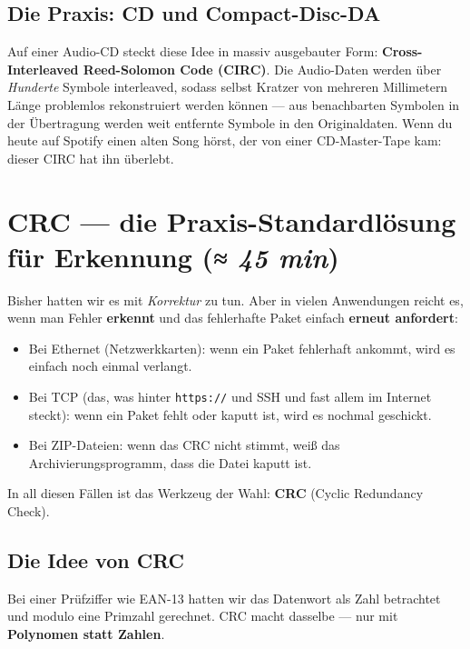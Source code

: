 \subsection*{Die Praxis: CD und Compact-Disc-DA}

Auf einer Audio-CD steckt diese Idee in massiv ausgebauter Form:
\textbf{Cross-Interleaved Reed-Solomon Code (CIRC)}. Die Audio-Daten
werden über \emph{Hunderte} Symbole interleaved, sodass selbst Kratzer
von mehreren Millimetern Länge problemlos rekonstruiert werden können
— aus benachbarten Symbolen in der Übertragung werden weit entfernte
Symbole in den Originaldaten. Wenn du heute auf Spotify einen alten
Song hörst, der von einer CD-Master-Tape kam: dieser CIRC hat ihn
überlebt.

\section{CRC — die Praxis-Standardlösung für Erkennung \normalfont(\textit{≈ 45 min})}

Bisher hatten wir es mit \emph{Korrektur} zu tun. Aber in vielen
Anwendungen reicht es, wenn man Fehler \textbf{erkennt} und das
fehlerhafte Paket einfach \textbf{erneut anfordert}:

\begin{itemize}
\item Bei Ethernet (Netzwerkkarten): wenn ein Paket fehlerhaft
  ankommt, wird es einfach noch einmal verlangt.
\item Bei TCP (das, was hinter \texttt{https://} und SSH und fast
  allem im Internet steckt): wenn ein Paket fehlt oder kaputt ist,
  wird es nochmal geschickt.
\item Bei ZIP-Dateien: wenn das CRC nicht stimmt, weiß das
  Archivierungsprogramm, dass die Datei kaputt ist.
\end{itemize}

In all diesen Fällen ist das Werkzeug der Wahl: \textbf{CRC} (Cyclic
Redundancy Check).

\subsection*{Die Idee von CRC}

Bei einer Prüfziffer wie EAN-13 hatten wir das Datenwort als Zahl
betrachtet und modulo eine Primzahl gerechnet. CRC macht dasselbe —
nur mit \textbf{Polynomen statt Zahlen}.

